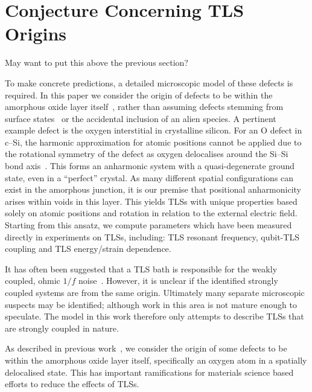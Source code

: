 \section{Conjecture Concerning TLS Origins}

May want to put this above the previous section?

To make concrete predictions, a detailed microscopic model of these defects is required.
In this paper we consider the origin of defects to be within the amorphous oxide layer itself~\cite{Lacquaniti2012}, rather than assuming defects stemming from surface states~\cite{Choi2009} or the accidental inclusion of an alien species.
A pertinent example defect is the oxygen interstitial in crystalline silicon. For an O defect in c--Si, the harmonic approximation for atomic positions cannot be applied due to the rotational symmetry of the defect as oxygen delocalises around the Si--Si bond axis~\cite{Artacho1995}.
This forms an anharmonic system with a quasi-degenerate ground state, even in a ``perfect'' crystal.
As many different spatial configurations can exist in the  amorphous junction, it is our premise that positional anharmonicity arises within voids in this layer.
This yields TLSs with unique properties based solely on atomic positions and rotation in relation to the external electric field.
Starting from this ansatz, we compute parameters which have been measured directly in experiments on TLSs, including: TLS resonant frequency, qubit-TLS coupling and TLS energy/strain dependence.

It has often been suggested that a TLS bath is responsible for the weakly coupled, ohmic $1/f$ noise~\cite{Dutta1981}.
However, it is unclear if the identified strongly coupled systems are from the same origin.
Ultimately many separate microscopic suspects may be identified; although work in this area is not mature enough to speculate.
The model in this work therefore only attempts to describe TLSs that are strongly coupled in nature.

As described in previous work~\cite{DuBois2013}, we consider the origin of some defects to be within the amorphous oxide layer itself, specifically an oxygen atom in a spatially delocalised state.
This has important ramifications for materials science based efforts to reduce the effects of TLSs.


